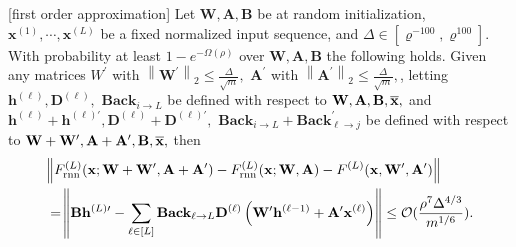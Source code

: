 \begin{lemma} \label{lemma:perturb_NTK_small_output} [first order approximation]
	Let $\mathbf{W}, \mathbf{A}, \mathbf{B}$ be at random initialization, $\mathbf{x}^{(1)}, \cdots, \mathbf{x}^{(L)}$ be a fixed normalized input sequence, and $\Delta \in\left[\varrho^{-100}, \varrho^{100}\right] .$ With probability at least $1-e^{-\Omega(\rho)}$ over $\mathbf{W}, \mathbf{A}, \mathbf{B}$ the following holds. Given any matrices $W^{\prime}$ with $\left\|\mathbf{W}^{\prime}\right\|_{2} \leq \frac{\Delta}{\sqrt{m}},$ $\mathbf{A}^{\prime}$ with $\left\|\mathbf{A}^{\prime}\right\|_{2} \leq \frac{\Delta}{\sqrt{m}},$, letting
	$\mathbf{h}^{(\ell)}, \mathbf{D}^{(\ell)},$  $\mathbf{Back}_{i \rightarrow L}$ be defined with respect to $\mathbf{W}, \mathbf{A}, \mathbf{B}, \overline{\mathbf{x}},$ and $\mathbf{h}^{(\ell)} + \mathbf{h}^{(\ell)\prime}, \mathbf{D}^{(\ell)} + \mathbf{D}^{(\ell)\prime},$  $\mathbf{Back}_{i \rightarrow L} + \mathbf{Back}^{\prime}_{\ell \rightarrow j}$ be defined with respect to $\mathbf{W}+\mathbf{W}^{\prime}, \mathbf{A} + \mathbf{A}',  \mathbf{B}, \overline{\mathbf{x}},$
	then
	\begin{align*}
	    &\norm{F^{(L)}_{\mathrm{rnn}}(\mathbf{x}; \mathbf{W} + \mathbf{W}', \mathbf{A} + \mathbf{A}') - F^{(L)}_{\mathrm{rnn}}(\mathbf{x}; \mathbf{W}, \mathbf{A}) - F^{(L)}(\mathbf{x}, \mathbf{W}', \mathbf{A}')} \\&
		= \norm{\mathbf{B} \mathbf{h}^{(L)\prime} - \sum_{\ell \in [L]} \mathbf{Back}_{\ell \rightarrow L}  \mathbf{D}^{(\ell)} \left(\mathbf{W}' \mathbf{h}^{(\ell-1)} + \mathbf{A}' \mathbf{x}^{(\ell)} \right)} \le \mathcal{O}(\frac{\rho^7 \Delta^{4/3}}{m^{1/6}}).
	\end{align*}
\end{lemma}

